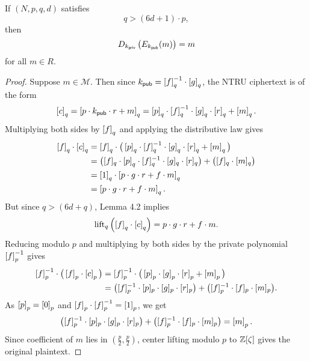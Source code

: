 \documentclass[10pt,reqno]{article}
\begin{document}
\begin{theorem}\label{theorem:4.3}
    If $(N, p, q, d)$ satisfies 
    \[q > (6d + 1) \cdot p,\] 
    then 
    \[D_{k_{\sf{priv}}}\left(E_{k_{\sf{pub}}} (m)\right)=m\]
    for all $m \in R$.
\end{theorem}
\begin{proof}Suppose $m \in \mathcal{M}$. Then since $k_{\sf{pub}}=\eq{f}{q}^{-1} \cdot \eq{g}{q}$, the NTRU ciphertext is of the form  
    \[\eq{c}{q}= \eq{p\cdot k_{\sf{pub}}\cdot r+m}{q} = \eq{p}{q} \cdot \eq{f}{q}^{-1} \cdot \eq{g}{q} \cdot \eq{r}{q} + \eq{m}{q}.\]
    Multiplying both sides by $\eq{f}{q}$ and applying the distributive law gives
    \begin{align*}
        \eq{f}{q} \cdot \eq{c}{q}&= \eq{f}{q} \cdot \big(\eq{p}{q} \cdot \eq{f}{q}^{-1} \cdot \eq{g}{q} \cdot \eq{r}{q} + \eq{m}{q}\big)
        \\&=\big( [f]_q \cdot  \eq{p}{q} \cdot [f]_q^{-1} \cdot  [g]_q \cdot [r]_q \big) + \big( [f]_q \cdot  [m]_q \big) 
        \\&= \eq{1}{q} \cdot \eq{p \cdot g \cdot r + f \cdot m}{q}
        \\&=  \eq{p \cdot g \cdot r + f \cdot m}{q}.
    \end{align*}
    But since $q > (6d +q)$, Lemma 4.2 implies 
    \[\lift{ \eq{f}{q} \cdot \eq{c}{q} }{q} = p \cdot g \cdot r + f \cdot m.\]
    Reducing modulo $p$ and multiplying by both sides by the private polynomial $\eq{f}{p}^{-1}$ gives
    \begin{align*}
        \eq{f}{p}^{-1} \cdot \big( \eq{f}{p} \cdot \eq{c}{p}\big) &= \eq{f}{p}^{-1} \cdot \big( \eq{p}{p} \cdot \eq{g}{p} \cdot \eq{r}{p}+ \eq{m}{p} \big)
        \\&=\big([f]_p^{-1} \cdot [p]_p \cdot [g]_p \cdot [r]_p\big) + \big( [f]_p^{-1}\cdot [f]_p \cdot  [m]_p \big).
    \end{align*}
    As $\eq{p}{p}=\eq{0}{p}$ and $\eq{f}{p}\cdot \eq{f}{p}^{-1}=\eq{1}{p}$, we get 
    \[ \big([f]_p^{-1} \cdot [p]_p \cdot [g]_p \cdot [r]_p\big) + \big( [f]_p^{-1}\cdot [f]_p \cdot  [m]_p \big) =\eq{m}{p}.\]
    Since coefficient of $m$ lies in $(\frac{p}{2},\frac{p}{2})$, center lifting modulo $p$ to $\Z[\zeta]$ gives the original plaintext.
\end{proof}


\pagebreak


\pagebreak
\end{document}
